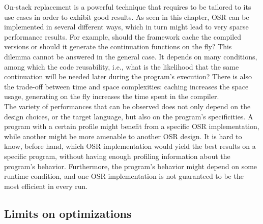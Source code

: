 On-stack replacement is a powerful technique that requires to be tailored to its use cases in order to exhibit good results.
As seen in this chapter, OSR can be implemented in several different ways, which in turn might lead to very sparse performance results.
For example, should the framework cache the compiled versions or should it generate the continuation functions on the fly?
This dilemma cannot be answered in the general case.
It depends on many conditions, among which the code reusability, i.e., what is the likelihood that the same continuation will be needed later during the program's execution?
There is also the trade-off between time and space complexities: caching increases the space usage, generating on the fly increases the time spent in the compiler.\\

The variety of performances that can be observed does not only depend on the design choices, or the target language, but also on the program's specificities.
A program with a certain profile might benefit from a specific OSR implementation, while another might be more amenable to another OSR design.
It is hard to know, before hand, which OSR implementation would yield the best results on a specific program, without having enough profiling information about the program's behavior. 
Furthermore, the program's behavior might depend on some runtime condition, and one OSR implementation is not guaranteed to be the most efficient in every run.  

\subsection{Limits on optimizations}

